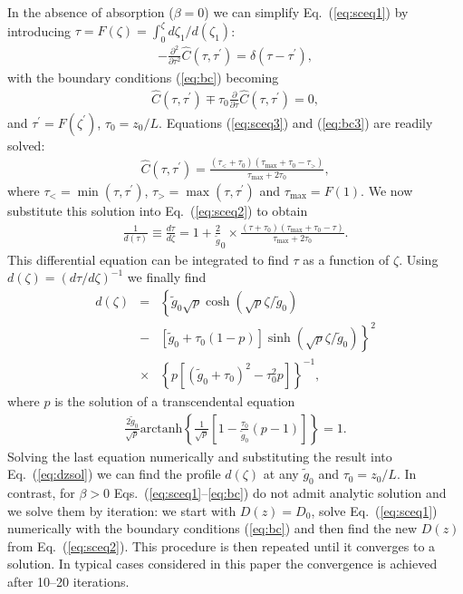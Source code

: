 In the absence of absorption ($\beta = 0$) we can simplify Eq.~(\ref{eq:sceq1}) by introducing $\tau = F(\zeta) = \int_0^{\zeta} d\zeta_1/d(\zeta_1)$:
\begin{eqnarray}
-\frac{\partial^2}{\partial \tau^2} {\hat C}(\tau, \tau^{\prime})
= \delta(\tau-\tau^{\prime}),
\label{eq:sceq3}
\end{eqnarray}
with the boundary conditions (\ref{eq:bc}) becoming
\begin{eqnarray}
{\hat C}(\tau, \tau^{\prime}) \mp
\tau_0 \frac{\partial}{\partial \tau}
{\hat C}(\tau, \tau^{\prime}) = 0,
\label{eq:bc3}
\end{eqnarray}
and $\tau^{\prime} = F(\zeta^{\prime})$, $\tau_0 = z_0/L$. Equations (\ref{eq:sceq3}) and (\ref{eq:bc3}) are readily solved:
\begin{eqnarray}
{\hat C}(\tau, \tau^{\prime}) =
\frac{(\tau_< + \tau_0)(\tau_{\mathrm{max}} + \tau_0 - \tau_>)}{\tau_{\mathrm{max}} + 2 \tau_0},
\label{eq:sol}
\end{eqnarray}
where $\tau_< = \min(\tau, \tau^{\prime})$, $\tau_> = \max(\tau, \tau^{\prime})$ and $\tau_{\mathrm{max}} = F(1)$.  We now substitute this solution into Eq.~(\ref{eq:sceq2}) to obtain
\begin{eqnarray}
\frac{1}{d(\tau)} \equiv \frac{d \tau}{d\zeta} =
1 + \frac{2}{\tilde g}_0 \times \frac{(\tau + \tau_0)(\tau_{\mathrm{max}} + \tau_0 - \tau)}{\tau_{\mathrm{max}} + 2 \tau_0}.
\label{eq:dtdz}
\end{eqnarray}
This differential equation can be integrated to find $\tau$ as a function of $\zeta$. Using $d(\zeta) = (d\tau/d\zeta)^{-1}$ we finally find
\begin{eqnarray}
d(\zeta) &=& \left\{ {\tilde g}_0 \sqrt{p} \cosh(\sqrt{p} \zeta/{\tilde g}_0) \right.
\nonumber \\
&-& \left. [{\tilde g}_0 + \tau_0(1 - p)] \sinh(\sqrt{p} \zeta/{\tilde g}_0) \right\}^2
\nonumber \\
&\times& \left\{ p [({\tilde g}_0 + \tau_0)^2 - \tau_0^2 p]
\right\}^{-1},
\label{eq:dzsol}
\end{eqnarray}
where $p$ is the solution of a transcendental equation
\begin{eqnarray}
\frac{2 {\tilde g}_0}{\sqrt{p}}
\mathrm{arctanh} \left\{ \frac{1}{\sqrt{p}}
\left[ 1 - \frac{\tau_0}{{\tilde g}_0} \left(p - 1 \right) \right] \right\} = 1.
\label{eq:p}
\end{eqnarray}
Solving the last equation numerically and substituting the result into Eq.~(\ref{eq:dzsol}) we can find the profile $d(\zeta)$ at any ${\tilde g}_0$ and $\tau_0 = z_0/L$. In contrast,
for $\beta > 0$ Eqs.\ (\ref{eq:sceq1}--\ref{eq:bc}) do not admit analytic solution and we solve them by iteration: we start with $D(z) = D_0$, solve Eq.~(\ref{eq:sceq1}) numerically with the boundary conditions (\ref{eq:bc}) and then find the new $D(z)$ from Eq.~(\ref{eq:sceq2}). This procedure is then repeated until it converges to a solution. In typical cases considered in this paper the convergence is achieved after 10--20 iterations.

